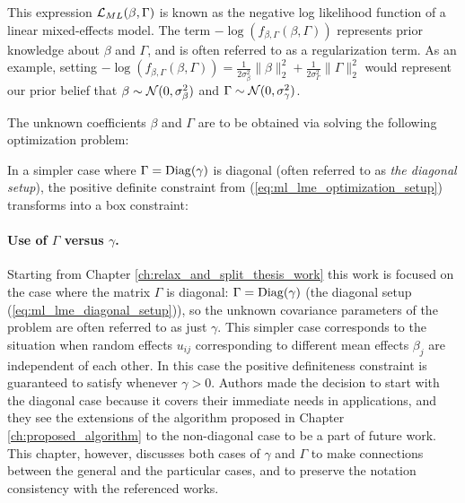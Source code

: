 \documentclass[11pt,letterpaper]{article}
\numberwithin{equation}{section} %
\numberwithin{figure}{section} %
\numberwithin{table}{section} %
\begin{document}
This expression $\operatorname{\mathcal{L}}_{ML}(\beta, \Gamma)$ is known as the negative log likelihood function of a linear mixed-effects model. The term $-\log(f_{\beta, \Gamma}(\beta, \Gamma))$ represents prior knowledge about $\beta$ and $\Gamma$, and is often referred to as a regularization term. As an example, setting $-\log(f_{\beta, \Gamma}(\beta, \Gamma)) = \frac{1}{2\sigma^2_\beta}\|\beta\|_2^2 + \frac{1}{2\sigma^2_\Gamma}\|\Gamma\|_2^2$ would represent our prior belief that $\beta \sim \operatorname{\mathcal{N}}(0, \sigma^2_\beta)$ and $\Gamma \sim \operatorname{\mathcal{N}}(0, \sigma^2_\gamma)$.

The unknown coefficients $\beta$ and $\Gamma$ are to be obtained via solving the following optimization problem:


In a simpler case where $\Gamma = \operatorname{Diag}(\gamma)$ is diagonal (often referred to as \textit{the diagonal setup}), the positive definite constraint from (\ref{eq:ml_lme_optimization_setup}) transforms into a box constraint:


\begin{tip}
\paragraph{Use of $\Gamma$ versus $\gamma$.} Starting from Chapter \ref{ch:relax_and_split_thesis_work} this work is focused on the case where the matrix $\Gamma$ is diagonal: $\Gamma = \operatorname{Diag}(\gamma)$ (the diagonal setup (\ref{eq:ml_lme_diagonal_setup})), so the unknown covariance parameters of the problem are often referred to as just $\gamma$. This simpler case corresponds to the situation when random effects $u_{ij}$ corresponding to different mean effects $\beta_j$ are independent of each other. In this case the positive definiteness constraint is guaranteed to satisfy whenever $\gamma > 0$. Authors made the decision to start with the diagonal case because it covers their immediate needs in applications, and they see the extensions of the algorithm proposed in Chapter \ref{ch:proposed_algorithm} to the non-diagonal case to be a part of future work. This chapter, however, discusses both cases of $\gamma$ and $\Gamma$ to make connections between the general and the particular cases, and to preserve the notation consistency with the referenced works.
\end{tip}
\end{document}
